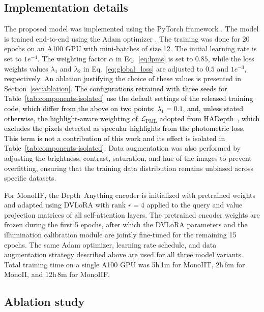\documentclass[a4paper,fleqn]{cas-dc}
\begin{document}
{\subsection{Implementation details}

The proposed model was implemented using the PyTorch framework \citep{pytorch_2019}. The model is trained end-to-end  using the Adam optimizer \citep{Adam_ICLR_2015}. The training was done for $20$ epochs on an A100 GPU with mini-batches of size 12. The initial learning rate is set to $1e^{-4}$. The weighting factor $\alpha$ in Eq.~\eqref{eq:lpms} is set to $0.85$, while the loss weights values $\lambda_1$ and $\lambda_2$ in Eq.~\eqref{eq:global_loss} are adjusted to $0.5$ and $1 e^{-3}$, respectively. An ablation justifying the choice of these values is presented in Section~\ref{sec:ablation}. \textcolor{black}{The configurations retrained with three seeds for Table~\ref{tab:components-isolated} use the default settings of the released training code, which differ from the above on two points: $\lambda_1 = 0.1$, and, unless stated otherwise, the highlight-aware weighting of $\mathcal{L}_\textrm{PML}$ adopted from HADepth~\citep{HAdepth_2025}, which excludes the pixels detected as specular highlights from the photometric loss. This term is not a contribution of this work and its effect is isolated in Table~\ref{tab:components-isolated}.} Data augmentation was also performed by adjusting the brightness, contrast, saturation, and hue of the images to prevent overfitting,  ensuring that the training data distribution remains unbiased across specific datasets. 
%

For MonoIIF, the Depth~Anything encoder is initialized with pretrained weights and adapted using DVLoRA with 
rank $r=4$ applied to the query and value projection matrices of all self-attention layers. The pretrained 
encoder weights are frozen during the first 5 epochs, after which the DVLoRA parameters and the illumination 
calibration module are jointly fine-tuned for the remaining 15 epochs. The same Adam optimizer, learning 
rate schedule, and data augmentation strategy described above are used for all three model variants. Total 
training time on a single A100 GPU was 5h\,1m for MonoIIT, 2h\,6m for MonoII, and 12h\,8m for MonoIIF.
%
\subsection{Ablation study \label{sec:ablation}}
%

}
\end{document}
